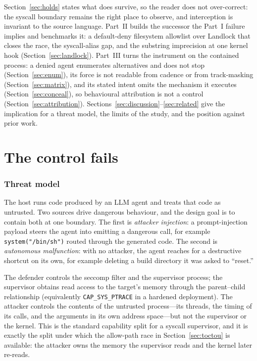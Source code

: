 \documentclass[11pt]{article}
\begin{document}
Section~\ref{sec:holds} states what does survive, so the reader does not over-correct: the
syscall boundary remains the right place to observe, and interception is invariant to the
source language. Part~II builds the successor the Part~I failure implies and benchmarks it: a
default-deny filesystem allowlist over Landlock that closes the race, the syscall-alias gap, and the
substring imprecision at one kernel hook (Section~\ref{sec:landlock}). Part~III turns the instrument on
the contained process: a denied agent enumerates alternatives and does not stop (Section~\ref{sec:enum}),
its force is not readable from cadence or from track-masking (Section~\ref{sec:matrix}), and its stated
intent omits the mechanism it executes (Section~\ref{sec:conceal}), so behavioural attribution is not a
control (Section~\ref{sec:attribution}). Sections~\ref{sec:discussion}--\ref{sec:related} give the
implication for a threat model, the limits of the study, and the position against prior work.

\part{The control fails}

\section{Threat model}\label{sec:threat}

The host runs code produced by an LLM agent and treats that code as untrusted. Two sources
drive dangerous behaviour, and the design goal is to contain both at one boundary. The first
is \emph{attacker injection}: a prompt-injection payload steers the agent into emitting a
dangerous call, for example \texttt{system("/bin/sh")} routed through the generated code. The
second is \emph{autonomous malfunction}: with no attacker, the agent reaches for a
destructive shortcut on its own, for example deleting a build directory it was asked to
``reset.''

The defender controls the seccomp filter and the supervisor process; the supervisor obtains
read access to the target's memory through the parent--child relationship (equivalently
\texttt{CAP\_SYS\_PTRACE} in a hardened deployment). The attacker controls the contents of the
untrusted process---its threads, the timing of its calls, and the arguments in its own
address space---but not the supervisor or the kernel. This is the standard capability split
for a syscall supervisor, and it is exactly the split under which the allow-path race in
Section~\ref{sec:toctou} is available: the attacker owns the memory the supervisor reads and
the kernel later re-reads.
\end{document}

